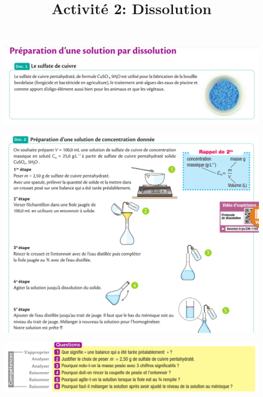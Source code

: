 \documentclass[10pt]{article}
\newcommand{\myscale}{0.5}
\newcommand{\titreActivite}{\huge Activité 2: Dissolution} %
\begin{document}
\date{}
\title{\titreActivite}
\maketitle %



\begin{center}

	\includegraphics[scale=\myscale]{assets/d1.png}

	\includegraphics[scale=\myscale]{assets/d2.png}

	\includegraphics[scale=\myscale]{assets/q.png}


\end{center}
\end{document}
